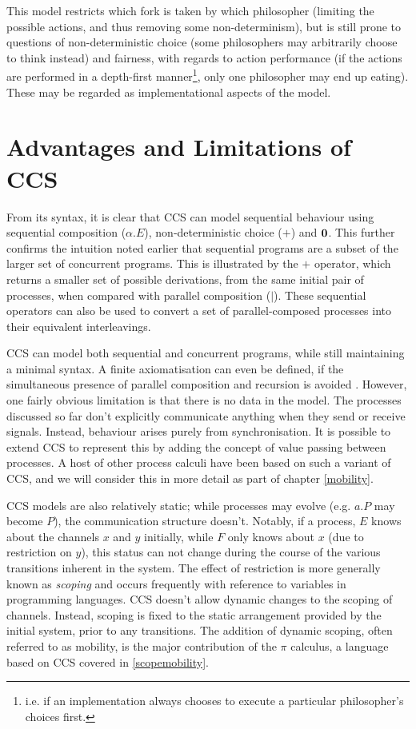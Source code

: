 This model restricts which fork is taken by which philosopher
(limiting the possible actions, and thus removing some
non-determinism), but is still prone to questions of non-deterministic
choice (some philosophers may arbitrarily choose to think instead) and
fairness, with regards to action performance (if the actions are
performed in a depth-first manner\footnote{i.e. if an implementation
  always chooses to execute a particular philosopher's choices
  first.}, only one philosopher may end up eating).  These may be
regarded as implementational aspects of the model.

\section{Advantages and Limitations of CCS}
\label{ccslimit}

From its syntax, it is clear that CCS can model sequential behaviour
using sequential composition ($\alpha.E$), non-deterministic choice
($+$) and $\textbf{0}$.  This further confirms the intuition noted earlier that
sequential programs are a subset of the larger set of concurrent
programs.  This is illustrated by the $+$ operator, which
returns a smaller set of possible derivations, from the same initial
pair of processes, when compared with parallel composition ($|$).
These sequential operators can also be used to convert a set of
parallel-composed processes into their equivalent interleavings.

CCS can model both sequential and concurrent programs, while still
maintaining a minimal syntax.  A finite axiomatisation can even be
defined, if the simultaneous presence of parallel composition and
recursion is avoided \cite{milner:ccsaxiom}.  However, one fairly
obvious limitation is that there is no data in the model.  The
processes discussed so far don't explicitly communicate anything when
they send or receive signals.  Instead, behaviour arises purely from
synchronisation.  It is possible to extend CCS to represent this by
adding the concept of value passing between processes.  A host of
other process calculi have been based on such a variant of CCS, and we
will consider this in more detail as part of chapter \ref{mobility}.

CCS models are also relatively static; while processes may evolve
(e.g. $a.P$ may become $P$), the communication structure doesn't.
Notably, if a process, $E$ knows about the channels $x$ and $y$
initially, while $F$ only knows about $x$ (due to restriction on $y$),
this status can not change during the course of the various
transitions inherent in the system.  The effect of restriction is more
generally known as \emph{scoping} and occurs frequently with reference
to variables in programming languages.  CCS doesn't allow dynamic
changes to the scoping of channels.  Instead, scoping is fixed to the
static arrangement provided by the initial system, prior to any
transitions.  The addition of dynamic scoping, often referred to as
mobility, is the major contribution of the $\pi$ calculus, a language
based on CCS covered in \ref{scopemobility}.

